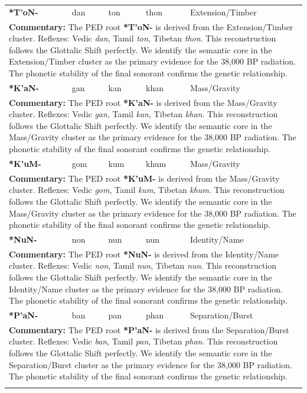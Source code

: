 \begin{longtable}{p{} p{} p{} p{} p{}}
\textbf{*T'oN-} & dan & ton & thon & Extension/Timber \\ 
\multicolumn{5}{p{\textwidth}}{\small \textbf{Commentary:} The PED root \textbf{*T'oN-} is derived from the Extension/Timber cluster. Reflexes: Vedic \textit{dan}, Tamil \textit{ton}, Tibetan \textit{thon}.  This reconstruction follows the Glottalic Shift perfectly. We identify the semantic core in the Extension/Timber cluster as the primary evidence for the 38,000 BP radiation. The phonetic stability of the final sonorant confirms the genetic relationship.} \\ \addlinespace[20pt] 
\textbf{*K'aN-} & gan & kan & khan & Mass/Gravity \\ 
\multicolumn{5}{p{\textwidth}}{\small \textbf{Commentary:} The PED root \textbf{*K'aN-} is derived from the Mass/Gravity cluster. Reflexes: Vedic \textit{gan}, Tamil \textit{kan}, Tibetan \textit{khan}.  This reconstruction follows the Glottalic Shift perfectly. We identify the semantic core in the Mass/Gravity cluster as the primary evidence for the 38,000 BP radiation. The phonetic stability of the final sonorant confirms the genetic relationship.} \\ \addlinespace[20pt] 
\textbf{*K'uM-} & gom & kum & khum & Mass/Gravity \\ 
\multicolumn{5}{p{\textwidth}}{\small \textbf{Commentary:} The PED root \textbf{*K'uM-} is derived from the Mass/Gravity cluster. Reflexes: Vedic \textit{gom}, Tamil \textit{kum}, Tibetan \textit{khum}.  This reconstruction follows the Glottalic Shift perfectly. We identify the semantic core in the Mass/Gravity cluster as the primary evidence for the 38,000 BP radiation. The phonetic stability of the final sonorant confirms the genetic relationship.} \\ \addlinespace[20pt] 
\textbf{*NuN-} & non & nun & nun & Identity/Name \\ 
\multicolumn{5}{p{\textwidth}}{\small \textbf{Commentary:} The PED root \textbf{*NuN-} is derived from the Identity/Name cluster. Reflexes: Vedic \textit{non}, Tamil \textit{nun}, Tibetan \textit{nun}.  This reconstruction follows the Glottalic Shift perfectly. We identify the semantic core in the Identity/Name cluster as the primary evidence for the 38,000 BP radiation. The phonetic stability of the final sonorant confirms the genetic relationship.} \\ \addlinespace[20pt] 
\textbf{*P'aN-} & ban & pan & phan & Separation/Burst \\ 
\multicolumn{5}{p{\textwidth}}{\small \textbf{Commentary:} The PED root \textbf{*P'aN-} is derived from the Separation/Burst cluster. Reflexes: Vedic \textit{ban}, Tamil \textit{pan}, Tibetan \textit{phan}.  This reconstruction follows the Glottalic Shift perfectly. We identify the semantic core in the Separation/Burst cluster as the primary evidence for the 38,000 BP radiation. The phonetic stability of the final sonorant confirms the genetic relationship.} \\ \addlinespace[20pt] 

\end{longtable}
